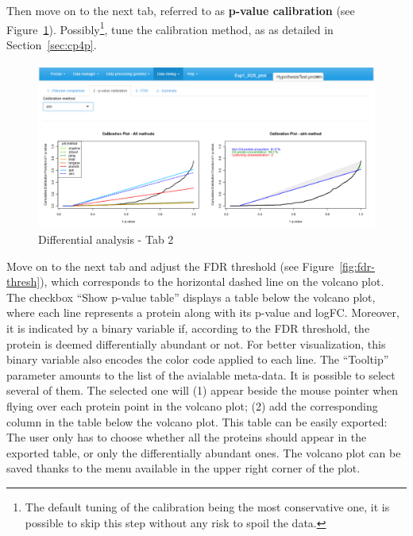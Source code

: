 \documentclass[12pt]{article}
\begin{document}
Then move on to the next tab, referred to as \textbf{p-value calibration} (see Figure~\ref{fig:cp4p-default}).  
Possibly\footnote{The default tuning of the calibration being the most conservative one, it is possible to skip this step without any risk to spoil the data.}, tune the calibration method, as as detailed in Section~\ref{sec:cp4p}.

\begin {figure}
\includegraphics[width=\textwidth]{images/cp4p-default.png}
\caption{Differential analysis - Tab 2}\label{fig:cp4p-default}
\end {figure}

Move on to the next tab and adjust the FDR threshold (see Figure~\ref{fig:fdr-thresh}), which corresponds to the horizontal dashed line on the volcano plot.  The checkbox ``Show p-value table'' displays a table below the volcano plot, where each line represents a protein along with its p-value and logFC. Moreover, it is indicated by a binary variable if, according to the FDR threshold, the protein is deemed differentially abundant or not. For better visualization, this binary variable also encodes the color code applied to each line. The ``Tooltip'' parameter amounts to the list of the avialable meta-data. It is possible to select several of them. The selected one will (1) appear beside the mouse pointer when flying over each protein point in the volcano plot; (2) add the corresponding column in the table below the volcano plot. This table can be easily exported: The user only has to choose whether all the proteins should appear in the exported table, or only the differentially abundant ones. The volcano plot can be saved thanks to the menu available in the upper right corner of the plot.
\end{document}
